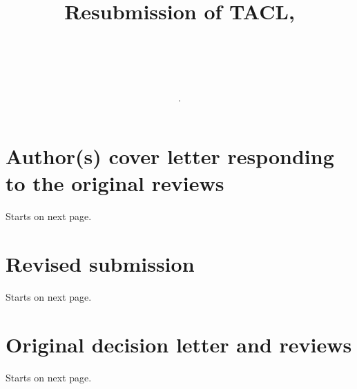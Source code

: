 \documentclass{article}[11pt,oneside]
\title{Resubmission of TACL, \\ \subtitle.   \\}
\newcommand{\resubmission}{paper.pdf}  %
\newcommand{\origdecision}{original_reviews.pdf}  %
\newcommand{\coverfile}{response.pdf}  %
\begin{document}
\maketitle

\tableofcontents

\section{Author(s) cover letter responding to the original reviews} Starts on next page.

\section{Revised submission} Starts on next page.

\section{Original decision letter and reviews} Starts on next page.

\end{document}

